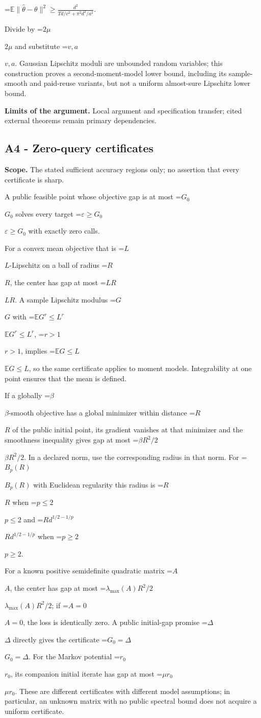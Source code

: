 \documentclass[10pt,a4paper]{article}
\newcommand{\AtlasMath}[1]{\par\begingroup\centering\setbox0=\hbox{$\displaystyle #1$}\ifdim\wd0>1.4\linewidth\typeout{ATLAS WIDE FORMULA: \the\wd0}\fi\ifdim\wd0>\linewidth\resizebox{\linewidth}{!}{\box0}\else\box0\fi\par\endgroup}
\newcommand{\AtlasInlineMath}[1]{\begingroup\setbox0=\hbox{$#1$}\ifdim\wd0>.4\linewidth\endgroup\AtlasMath{#1}\else\endgroup$#1$\fi}
\begin{document}
\AtlasMath{\mathbb E\|\widehat\theta-\theta\|^2\ge\frac{d^2}{Td/v^2+\pi^2d^2/a^2}.}

Divide by \AtlasInlineMath{2\mu} and substitute \AtlasInlineMath{v,a}. Gaussian Lipschitz moduli are unbounded random variables; this construction proves a second-moment-model lower bound, including its sample-smooth and paid-reuse variants, but not a uniform almost-sure Lipschitz lower bound.

\textbf{Limits of the argument.} Local argument and specification transfer; cited external theorems remain primary dependencies.

\subsection{A4 - Zero-query certificates}
\textbf{Scope.} The stated sufficient accuracy regions only; no assertion that every certificate is sharp.

A public feasible point whose objective gap is at most \AtlasInlineMath{G_0} solves every target \AtlasInlineMath{\varepsilon\ge G_0} with exactly zero calls.

For a convex mean objective that is \AtlasInlineMath{L}-Lipschitz on a ball of radius \AtlasInlineMath{R}, the center has gap at most \AtlasInlineMath{LR}. A sample Lipschitz modulus \AtlasInlineMath{G} with \AtlasInlineMath{\mathbb E G^r\le L^r}, \AtlasInlineMath{r>1}, implies \AtlasInlineMath{\mathbb E G\le L}, so the same certificate applies to moment models. Integrability at one point ensures that the mean is defined.

If a globally \AtlasInlineMath{\beta}-smooth objective has a global minimizer within distance \AtlasInlineMath{R} of the public initial point, its gradient vanishes at that minimizer and the smoothness inequality gives gap at most \AtlasInlineMath{\beta R^2/2}. In a declared norm, use the corresponding radius in that norm. For \AtlasInlineMath{B_p(R)} with Euclidean regularity this radius is \AtlasInlineMath{R} when \AtlasInlineMath{p\le2} and \AtlasInlineMath{R d^{1/2-1/p}} when \AtlasInlineMath{p\ge2}.

For a known positive semidefinite quadratic matrix \AtlasInlineMath{A}, the center has gap at most \AtlasInlineMath{\lambda_{\max}(A)R^2/2}; if \AtlasInlineMath{A=0}, the loss is identically zero. A public initial-gap promise \AtlasInlineMath{\Delta} directly gives the certificate \AtlasInlineMath{G_0=\Delta}. For the Markov potential \AtlasInlineMath{r_0}, its companion initial iterate has gap at most \AtlasInlineMath{\mu r_0}. These are different certificates with different model assumptions; in particular, an unknown matrix with no public spectral bound does not acquire a uniform certificate.
\end{document}
